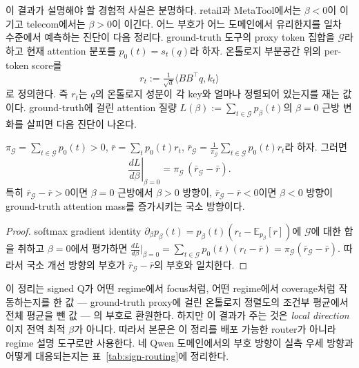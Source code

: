 이 결과가 설명해야 할 경험적 사실은 분명하다. retail과 MetaTool에서는 $\beta<0$이 이기고 telecom에서는 $\beta>0$이 이긴다. 어느 부호가 어느 도메인에서 유리한지를 일차 수준에서 예측하는 진단이 다음 정리다. ground-truth 도구의 proxy token 집합을 $\mathcal{G}$라 하고 현재 attention 분포를 $p_0(t) = s_t(q)$라 하자. 온톨로지 부분공간 위의 per-token score를
\begin{equation*}
r_t := \tfrac{1}{\sqrt d}\langle BB^\top q, k_t\rangle
\end{equation*}
로 정의한다. 즉 $r_t$는 $q$의 온톨로지 성분이 각 key와 얼마나 정렬되어 있는지를 재는 값이다. ground-truth에 걸린 attention 질량 $L(\beta) := \sum_{t\in\mathcal{G}} p_\beta(t)$의 $\beta=0$ 근방 변화를 살피면 다음 진단이 나온다.

\begin{theorem}[signed Q의 일차 개선 방향]\label{thm:beta-star}
$\pi_{\mathcal{G}} = \sum_{t\in\mathcal{G}} p_0(t) > 0$, $\bar r = \sum_t p_0(t) r_t$, $\bar r_{\mathcal{G}} = \frac{1}{\pi_{\mathcal{G}}}\sum_{t\in\mathcal{G}} p_0(t) r_t$라 하자. 그러면
\begin{equation}\label{eq:beta-star}
\left.\frac{dL}{d\beta}\right|_{\beta=0} = \pi_{\mathcal{G}}\,(\bar r_{\mathcal{G}} - \bar r).
\end{equation}
특히 $\bar r_{\mathcal{G}} - \bar r > 0$이면 $\beta=0$ 근방에서 $\beta>0$ 방향이, $\bar r_{\mathcal{G}} - \bar r < 0$이면 $\beta<0$ 방향이 ground-truth attention mass를 증가시키는 국소 방향이다.
\end{theorem}

\begin{proof}
softmax gradient identity $\partial_\beta p_\beta(t) = p_\beta(t)(r_t - \mathbb{E}_{p_\beta}[r])$에 $\mathcal{G}$에 대한 합을 취하고 $\beta=0$에서 평가하면 $\frac{dL}{d\beta}\big|_{\beta=0} = \sum_{t\in\mathcal{G}} p_0(t)(r_t - \bar r) = \pi_{\mathcal{G}}(\bar r_{\mathcal{G}} - \bar r)$. 따라서 국소 개선 방향의 부호가 $\bar r_{\mathcal{G}} - \bar r$의 부호와 일치한다.
\end{proof}

이 정리는 signed Q가 어떤 regime에서 focus처럼, 어떤 regime에서 coverage처럼 작동하는지를 한 값 --- ground-truth proxy에 걸린 온톨로지 정렬도의 조건부 평균에서 전체 평균을 뺀 값 --- 의 부호로 환원한다. 하지만 이 결과가 주는 것은 \emph{local direction}이지 전역 최적 $\beta$가 아니다. 따라서 본문은 이 정리를 배포 가능한 router가 아니라 regime 설명 도구로만 사용한다. 네 Qwen 도메인에서의 부호 방향이 실측 우세 방향과 어떻게 대응되는지는 표~\ref{tab:sign-routing}에 정리한다.

